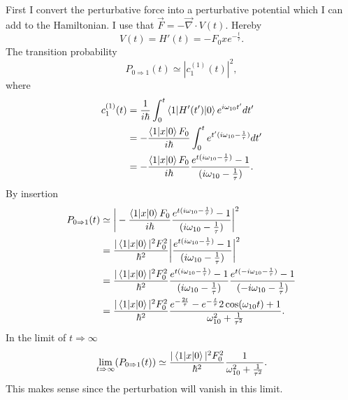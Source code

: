 \begin{example}
\begin{enumerate}
		First I convert the perturbative force into a perturbative potential which I can add to the Hamiltonian. I use that $\vec{F}=-\vec{\nabla}\cdot V(t)$. Hereby
		\begin{equation}
			V(t)=H'(t)=-F_0xe^{-\frac{t}{\tau}}.
		\end{equation} 
		The transition probability
		\begin{equation}
			P_{0\Rightarrow 1}(t)\simeq|c_1^{(1)}(t)|^2,
		\end{equation} 
		where
		\begin{equation}
			\begin{split}
				c_1^{(1)}(t)&=\frac{1}{i\hbar}\int_{0}^{t}\braket{1|H'(t')|0}e^{i\omega_{10}t'}dt'\\
				&=-\frac{\braket{1|x|0}F_0}{i\hbar}\int_{0}^{t}e^{t'(i\omega_{10}-\frac{1}{\tau})}dt'\\
				&=-\frac{\braket{1|x|0}F_0}{i\hbar}\frac{e^{t(i\omega_{10}-\frac{1}{\tau})}-1}{(i\omega_{10}-\frac{1}{\tau})}.\\
			\end{split}
		\end{equation} 
		By insertion
		\begin{equation}
			\begin{split}
				P_{0\Rightarrow 1}(t)&\simeq\bigg|-\frac{\braket{1|x|0}F_0}{i\hbar}\frac{e^{t(i\omega_{10}-\frac{1}{\tau})}-1}{(i\omega_{10}-\frac{1}{\tau})}\bigg|^2\\
				&=\frac{|\braket{1|x|0}|^2F_0^2}{\hbar^2}\bigg|\frac{e^{t(i\omega_{10}-\frac{1}{\tau})}-1}{(i\omega_{10}-\frac{1}{\tau})}\bigg|^2\\
				&=\frac{|\braket{1|x|0}|^2F_0^2}{\hbar^2}\frac{e^{t(i\omega_{10}-\frac{1}{\tau})}-1}{(i\omega_{10}-\frac{1}{\tau})}\frac{e^{t(-i\omega_{10}-\frac{1}{\tau})}-1}{(-i\omega_{10}-\frac{1}{\tau})}\\
				&=\frac{|\braket{1|x|0}|^2F_0^2}{\hbar^2}\frac{e^{-\frac{2t}{\tau}}-e^{-\frac{t}{\tau}}2\cos(\omega_{10}t)+1}{\omega_{10}^2+\frac{1}{\tau^2}}.\\
			\end{split}
		\end{equation} 
		In the limit of $t\Rightarrow \infty$
		\begin{equation}
			\lim\limits_{t\Rightarrow\infty}(P_{0\Rightarrow 1}(t))\simeq\frac{|\braket{1|x|0}|^2F_0^2}{\hbar^2}\frac{1}{\omega_{10}^2+\frac{1}{\tau^2}}.
		\end{equation} 
		This makes sense since the perturbation will vanish in this limit. 
		

\end{enumerate}
\end{example}

